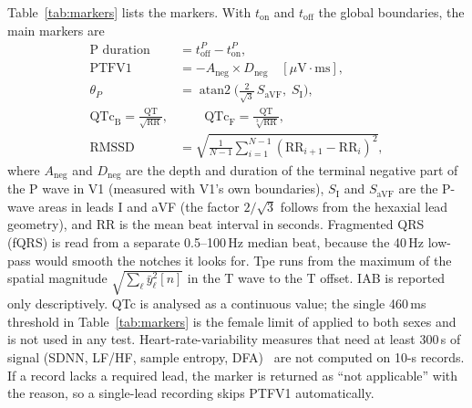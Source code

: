 \documentclass[conference]{IEEEtran}
\begin{document}
Table~\ref{tab:markers} lists the markers. With $t_\text{on}$ and $t_\text{off}$
the global boundaries, the main markers are
\begin{align}
\text{P duration} &= t^{P}_\text{off}-t^{P}_\text{on}, \\
\text{PTFV1} &= -A_\text{neg}\times D_\text{neg} \quad [\mu\text{V}\cdot\text{ms}], \\
\theta_P &= \operatorname{atan2}\!\big(\tfrac{2}{\sqrt{3}}\,S_\text{aVF},\; S_\text{I}\big), \\
\text{QTc}_\text{B} = \frac{\text{QT}}{\sqrt{\text{RR}}}, &\qquad
\text{QTc}_\text{F} = \frac{\text{QT}}{\sqrt[3]{\text{RR}}}, \\
\text{RMSSD} &= \sqrt{\tfrac{1}{N-1}\textstyle\sum_{i=1}^{N-1}(\text{RR}_{i+1}-\text{RR}_i)^2},
\end{align}
where $A_\text{neg}$ and $D_\text{neg}$ are the depth and duration of the
terminal negative part of the P wave in V1 (measured with V1's own boundaries),
$S_\text{I}$ and $S_\text{aVF}$ are the P-wave areas in leads I and aVF (the
factor $2/\sqrt{3}$ follows from the hexaxial lead geometry), and RR is the mean
beat interval in seconds. Fragmented QRS (fQRS) is read from a separate
0.5--100\,Hz median beat, because the 40\,Hz low-pass would smooth the notches it
looks for. Tpe runs from the maximum of the spatial magnitude
$\sqrt{\sum_\ell \bar{y}_\ell^2[n]}$ in the T wave to the T offset. IAB is
reported only descriptively. QTc is analysed as a continuous value; the single
460\,ms threshold in Table~\ref{tab:markers} is the female limit of
\cite{rautaharju2009aha4} applied to both sexes and is not used in any test.
Heart-rate-variability measures that need at least
300\,s of signal (SDNN, LF/HF, sample entropy, DFA)~\cite{taskforce1996hrv} are
not computed on 10-s records. If a record lacks a required lead, the marker is
returned as ``not applicable'' with the reason, so a single-lead recording skips
PTFV1 automatically.
\end{document}
